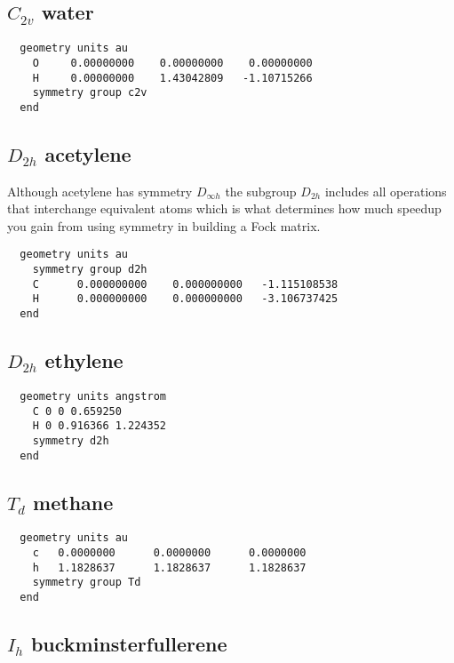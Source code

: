 \label{symexamples}

  \subsection{\protect$C_{2v}$ water}

\begin{verbatim}
  geometry units au
    O     0.00000000    0.00000000    0.00000000
    H     0.00000000    1.43042809   -1.10715266
    symmetry group c2v
  end
\end{verbatim}

  \subsection{\protect$D_{2h}$ acetylene}

Although acetylene has symmetry $D_{\infty h}$ the subgroup
$D_{2h}$ includes all operations that interchange equivalent atoms
which is what determines how much speedup you gain from using symmetry
in building a Fock matrix.

\begin{verbatim}
  geometry units au
    symmetry group d2h
    C      0.000000000    0.000000000   -1.115108538
    H      0.000000000    0.000000000   -3.106737425
  end
\end{verbatim}

  \subsection{\protect$D_{2h}$ ethylene}

\begin{verbatim}
  geometry units angstrom
    C 0 0 0.659250 
    H 0 0.916366 1.224352 
    symmetry d2h
  end
\end{verbatim}


  \subsection{\protect$T_d$ methane}

\begin{verbatim}
  geometry units au
    c   0.0000000      0.0000000      0.0000000
    h   1.1828637      1.1828637      1.1828637
    symmetry group Td
  end
\end{verbatim}

  \subsection{\protect$I_h$ buckminsterfullerene}

